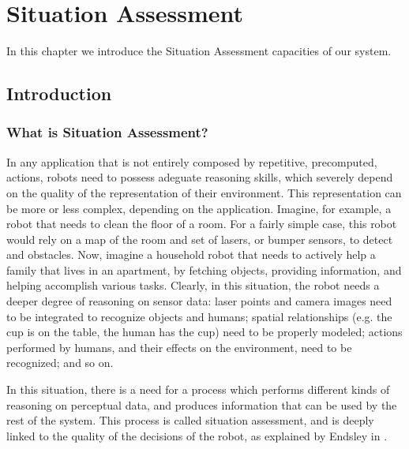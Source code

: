
\chapter{Situation Assessment} %

\label{chapter-situation_assessment} %


In this chapter we introduce the Situation Assessment capacities of our system. 

\section{Introduction}
\label{situation_assessment-intro}
\subsection{What is Situation Assessment?}
In any application that is not entirely composed by repetitive, precomputed, actions, robots need to possess adeguate reasoning skills, which severely depend on the quality of the representation of their environment. This representation can be more or less complex, depending on the application. Imagine, for example, a robot that needs to clean the floor of a room. For a fairly simple case, this robot would rely on a map of the room and set of lasers, or bumper sensors, to detect and obstacles. Now, imagine a household robot that needs to actively help a family that lives in an apartment, by fetching objects, providing information, and helping accomplish various tasks. Clearly, in this situation, the robot needs a deeper degree of reasoning on sensor data: laser points and camera images need to be integrated to recognize objects and humans; spatial relationships  (e.g. the cup is on the table, the human has the cup) need to be properly modeled; actions performed by humans, and their effects on the environment, need to be recognized; and so on. 

In this situation, there is a need for a process which performs different kinds of reasoning on perceptual data, and produces information that can be used by the rest of the system. This process is called situation assessment, and is deeply linked to the quality of the decisions of the robot, as explained by Endsley in \cite{endsley1995}. 


